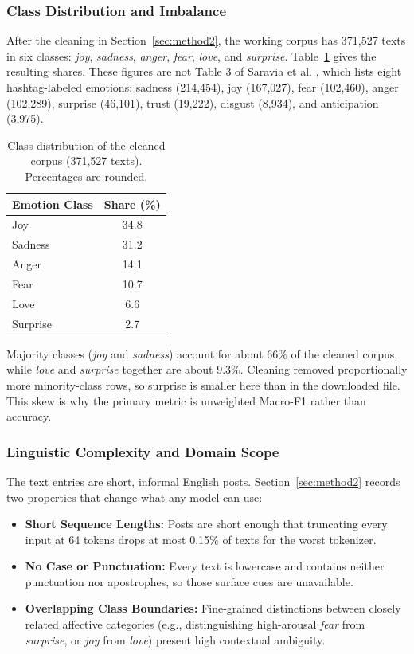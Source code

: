 \documentclass[conference]{IEEEtran}
\begin{document}
\subsubsection{Class Distribution and Imbalance}
After the cleaning in Section~\ref{sec:method2}, the working corpus has 371,527 texts in six classes: \textit{joy}, \textit{sadness}, \textit{anger}, \textit{fear}, \textit{love}, and \textit{surprise}. Table~\ref{tab:carer_distribution} gives the resulting shares. These figures are not Table 3 of Saravia et al. \cite{saravia2018carer}, which lists eight hashtag-labeled emotions: sadness (214,454), joy (167,027), fear (102,460), anger (102,289), surprise (46,101), trust (19,222), disgust (8,934), and anticipation (3,975).

\begin{table}[htbp]
\centering
\caption{Class distribution of the cleaned corpus (371,527 texts). Percentages are rounded.}
\label{tab:carer_distribution}
\small
\begin{tabular}{l c}
\toprule
\textbf{Emotion Class} & \textbf{Share (\%)} \\
\midrule
Joy & 34.8 \\
Sadness & 31.2 \\
Anger & 14.1 \\
Fear & 10.7 \\
Love & 6.6 \\
Surprise & 2.7 \\
\bottomrule
\end{tabular}
\end{table}

Majority classes (\textit{joy} and \textit{sadness}) account for about $66\%$ of the cleaned corpus, while \textit{love} and \textit{surprise} together are about $9.3\%$. Cleaning removed proportionally more minority-class rows, so surprise is smaller here than in the downloaded file. This skew is why the primary metric is unweighted Macro-F1 rather than accuracy.

\subsubsection{Linguistic Complexity and Domain Scope}
The text entries are short, informal English posts. Section~\ref{sec:method2} records two properties that change what any model can use:
\begin{itemize}
    \item \textbf{Short Sequence Lengths:} Posts are short enough that truncating every input at 64 tokens drops at most 0.15\% of texts for the worst tokenizer.
    \item \textbf{No Case or Punctuation:} Every text is lowercase and contains neither punctuation nor apostrophes, so those surface cues are unavailable.
    \item \textbf{Overlapping Class Boundaries:} Fine-grained distinctions between closely related affective categories (e.g., distinguishing high-arousal \textit{fear} from \textit{surprise}, or \textit{joy} from \textit{love}) present high contextual ambiguity.
\end{itemize}
\end{document}
